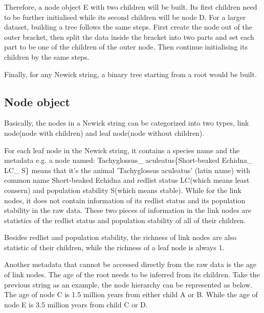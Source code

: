 \documentclass[MSc]{icldt}
\begin{document}
Therefore, a node object E with two children will be built. Its first children need to be further initialised while its second children will be node D. For a larger dataset, building a tree follows the same steps. First create the node out of the outer bracket, then split the data inside the bracket into two parts and set each part to be one of the children of the outer node. Then continue initialising its children by the same steps.

Finally, for any Newick string, a binary tree starting from a root would be built. 

\subsection{Node object}

Basically, the nodes in a Newick string can be categorized into two types, link node(node with children) and leaf node(node without children).

For each leaf node in the Newick string, it contains a species name and the metadata e.g. a node named: Tachyglossus\_ aculeatus\{Short-beaked Echidna\_ LC\_ S\} means that it's the animal 'Tachyglossus aculeatus' (latin name) with common name Short-beaked Echidna and redlist status LC(which means least consern) and population stability S(which means stable). While for the link nodes, it does not contain information of its redlist status and its population stability in the raw data. These two pieces of information in the link nodes are statistics of the redlist status and population stability of all of their children. 

Besides redlist and population stability, the richness of link nodes are also statistic of their children, while the richness of a leaf node is always 1. 

Another metadata that cannot be accessed directly from the raw data is the age of link nodes. The age of the root needs to be inferred from its children. Take the previous string as an example, the node hierarchy can be represented as below. The age of node C is 1.5 million years from either child A or B. While the age of node E is 3.5 million years from child C or D.

\begin{center}
\end{center}
\end{document}
